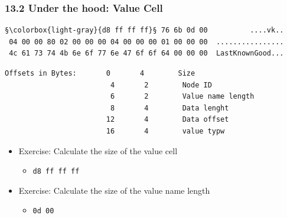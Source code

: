 \begin{frame}[fragile]
  \frametitle{13.2 Under the hood: Value Cell}
  \begin{lstlisting}[basicstyle=\tiny,escapechar=§]
                           §\colorbox{light-gray}{d8 ff ff ff}§ 76 6b 0d 00          ....vk..
 04 00 00 80 02 00 00 00 04 00 00 00 01 00 00 00  ................
 4c 61 73 74 4b 6e 6f 77 6e 47 6f 6f 64 00 00 00  LastKnownGood...
  \end{lstlisting}
  \begin{lstlisting}[basicstyle=\tiny]
 Offsets in Bytes:       0       4        Size
                         4       2        Node ID
                         6       2        Value name length
                         8       4        Data lenght
                        12       4        Data offset
                        16       4        value typw
  \end{lstlisting}
  \begin{itemize}
      \item Exercise: Calculate the size of the value cell
      \begin{itemize}
          \item[] \texttt{d8 ff ff ff}
      \end{itemize}
      \item Exercise: Calculate the size of the value name length
      \begin{itemize}
          \item[] \texttt{0d 00}
      \end{itemize}
  \end{itemize}
\end{frame}


